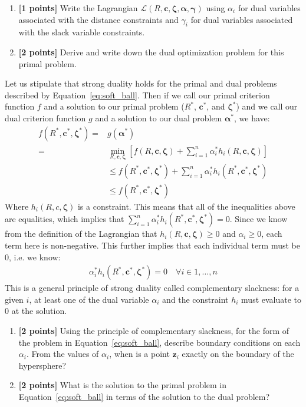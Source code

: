 \documentclass{article}
\begin{document}
\begin{enumerate}[resume]
\item \textbf{[1 points]} Write the Lagrangian $\mathcal{L}(R, \boldsymbol{c}, \boldsymbol{\zeta}, \boldsymbol{\alpha}, \boldsymbol{\gamma})$ using $\alpha_i$ for dual variables associated with the distance constraints and $\gamma_i$ for dual variables associated with the slack variable constraints.
\item \textbf{[2 points]} Derive and write down the dual optimization problem for this primal problem. 
\end{enumerate}
Let us stipulate that strong duality holds for the primal and dual problems described by Equation~\ref{eq:soft_ball}. Then if we call our primal criterion function $f$ and a solution to our primal problem ($R^{*}$, $\boldsymbol{c}^{*}$, and $\boldsymbol{\zeta}^{*}$) and we call our dual criterion function $g$ and a solution to our dual problem $\boldsymbol{\alpha}^{*}$, we have:
\begin{align*}
    f(R^{*}, \boldsymbol{c}^{*}, \boldsymbol{\zeta}^{*}) =& g(\boldsymbol{\alpha}^{*}) \\
    =& \mathop{\mathrm{min}}_{R,\boldsymbol{c}, \boldsymbol{\zeta}} \left[ f(R, \boldsymbol{c},\boldsymbol{\zeta}) + \sum_{i=1}^{n} \alpha_i^{*} h_i(R, \boldsymbol{c}, \boldsymbol{\zeta}) \right] \\
    &\le f(R^{*}, \boldsymbol{c}^{*}, \boldsymbol{\zeta}^{*}) + \sum_{i=1}^{n} \alpha_i^{*} h_i(R^{*}, \boldsymbol{c}^{*}, \boldsymbol{\zeta}^{*}) \\ 
    &\le f(R^{*}, \boldsymbol{c}^{*}, \boldsymbol{\zeta}^{*})
\end{align*}
Where $h_i(R, c, \boldsymbol{\zeta})$ is a constraint. This means that all of the inequalities above are equalities, which implies that $\sum_{i=1}^{n} \alpha_i^{*} h_i(R^{*}, \boldsymbol{c}^{*}, \boldsymbol{\zeta}^{*}) = 0$. Since we know from the definition of the Lagrangian that $h_i(R, \boldsymbol{c}, \boldsymbol{\zeta}) \ge 0$ and $\alpha_i \ge 0$, each term here is non-negative. This further implies that each individual term must be 0, i.e. we know:
\begin{align*}
    \alpha_i^{*} h_i(R^{*}, \boldsymbol{c}^{*},\boldsymbol{\zeta}^{*}) = 0\quad \forall i \in {1,\dotsc,n}
\end{align*}
This is a general principle of strong duality called complementary slackness: for a given $i$, at least one of the dual variable $\alpha_i$ and the constraint $h_i$ must evaluate to 0 at the solution.
\begin{enumerate}[resume]
\item \textbf{[2 points]} Using the principle of complementary slackness, for the form of the problem in Equation~\ref{eq:soft_ball}, describe boundary conditions on each $\alpha_i$. From the values of $\alpha_i$, when is a point $\boldsymbol{z}_i$ exactly on the boundary of the hypersphere?
\item \textbf{[2 points]} What is the solution to the primal problem in Equation~\ref{eq:soft_ball} in terms of the solution to the dual problem?
\end{enumerate}
\end{document}
